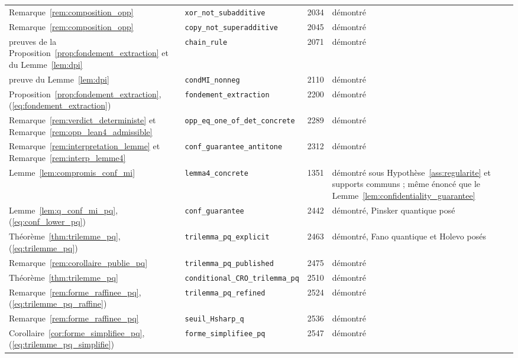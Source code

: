 {\begin{longtable}{@{}p{4.6cm}p{5.2cm}p{0.9cm}>{\raggedright\arraybackslash}p{3.6cm}@{}}
Remarque~\ref{rem:composition_opp} & \texttt{xor\_\allowbreak{}not\_\allowbreak{}subadditive} & 2034 & démontré \\
Remarque~\ref{rem:composition_opp} & \texttt{copy\_\allowbreak{}not\_\allowbreak{}superadditive} & 2045 & démontré \\
preuves de la Proposition~\ref{prop:fondement_extraction} et du Lemme~\ref{lem:dpi} & \texttt{chain\_\allowbreak{}rule} & 2071 & démontré \\
preuve du Lemme~\ref{lem:dpi} & \texttt{condMI\_\allowbreak{}nonneg} & 2110 & démontré \\
Proposition~\ref{prop:fondement_extraction}, (\ref{eq:fondement_extraction}) & \texttt{fondement\_\allowbreak{}extraction} & 2200 & démontré \\
Remarque~\ref{rem:verdict_deterministe} et Remarque~\ref{rem:opp_lean4_admissible} & \texttt{opp\_\allowbreak{}eq\_\allowbreak{}one\_\allowbreak{}of\_\allowbreak{}det\_\allowbreak{}concrete} & 2289 & démontré \\
Remarque~\ref{rem:interpretation_lemme} et Remarque~\ref{rem:interp_lemme4} & \texttt{conf\_\allowbreak{}guarantee\_\allowbreak{}antitone} & 2312 & démontré \\
Lemme~\ref{lem:compromis_conf_mi} & \texttt{lemma4\_\allowbreak{}concrete} & 1351 & démontré sous Hypothèse~\ref{ass:regularite} et supports communs ; même énoncé que le Lemme~\ref{lem:confidentiality_guarantee} \\
Lemme~\ref{lem:q_conf_mi_pq}, (\ref{eq:conf_lower_pq}) & \texttt{conf\_\allowbreak{}guarantee} & 2442 & démontré, Pinsker quantique posé \\
Théorème~\ref{thm:trilemme_pq}, (\ref{eq:trilemme_pq}) & \texttt{trilemma\_\allowbreak{}pq\_\allowbreak{}explicit} & 2463 & démontré, Fano quantique et Holevo posés \\
Remarque~\ref{rem:corollaire_publie_pq} & \texttt{trilemma\_\allowbreak{}pq\_\allowbreak{}published} & 2475 & démontré \\
Théorème~\ref{thm:trilemme_pq} & \texttt{conditional\_\allowbreak{}CRO\_\allowbreak{}trilemma\_\allowbreak{}pq} & 2510 & démontré \\
Remarque~\ref{rem:forme_raffinee_pq}, (\ref{eq:trilemme_pq_raffine}) & \texttt{trilemma\_\allowbreak{}pq\_\allowbreak{}refined} & 2524 & démontré \\
Remarque~\ref{rem:forme_raffinee_pq} & \texttt{seuil\_\allowbreak{}Hsharp\_\allowbreak{}q} & 2536 & démontré \\
Corollaire~\ref{cor:forme_simplifiee_pq}, (\ref{eq:trilemme_pq_simplifie}) & \texttt{forme\_\allowbreak{}simplifiee\_\allowbreak{}pq} & 2547 & démontré \\

\end{longtable}}
